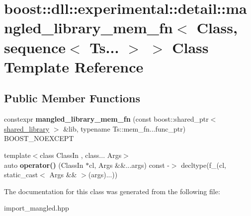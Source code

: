 \hypertarget{a00212}{}\section{boost\+:\+:dll\+:\+:experimental\+:\+:detail\+:\+:mangled\+\_\+library\+\_\+mem\+\_\+fn$<$ Class, sequence$<$ Ts... $>$ $>$ Class Template Reference}
\label{a00212}
\subsection*{Public Member Functions}
\begin{DoxyCompactItemize}
\item 
constexpr {\bfseries mangled\+\_\+library\+\_\+mem\+\_\+fn} (const boost\+::shared\+\_\+ptr$<$ \hyperlink{a00271}{shared\+\_\+library} $>$ \&lib, typename Ts\+::mem\+\_\+fn...\+func\+\_\+ptr) B\+O\+O\+S\+T\+\_\+\+N\+O\+E\+X\+C\+E\+PT\hypertarget{a00212_a1b94ef7faab1637ef38aa7367f5e9fc4}{}\label{a00212_a1b94ef7faab1637ef38aa7367f5e9fc4}

\item 
{\footnotesize template$<$class Class\+In , class... Args$>$ }\\auto {\bfseries operator()} (Class\+In $\ast$cl, Args \&\&...args) const  -\/$>$ decltype(f\+\_\+(cl, static\+\_\+cast$<$ Args \&\& $>$(args)...))        \hypertarget{a00212_a8c115040ee6dc521a6f4988264762702}{}\label{a00212_a8c115040ee6dc521a6f4988264762702}

\end{DoxyCompactItemize}


The documentation for this class was generated from the following file\+:\begin{DoxyCompactItemize}
\item 
import\+\_\+mangled.\+hpp\end{DoxyCompactItemize}
